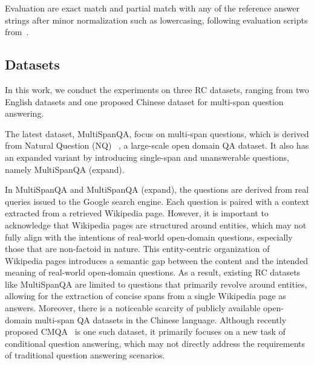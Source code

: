 \documentclass[a4paper]{cas-sc}
\newcommand{\1}[1]{\mathds{1}\left[#1\right]}
\begin{document}
Evaluation are exact match and partial match with any of the reference answer strings after minor normalization such as lowercasing, following evaluation scripts from~\cite{li2022multispanqa}.

\subsection{Datasets}
\label{sec:predata}
In this work, we conduct the experiments on three RC datasets, ranging from two English datasets and one proposed Chinese dataset for multi-span question answering. 

The latest dataset, MultiSpanQA, focus on multi-span questions, which is derived from Natural Question (NQ) ~\citep{DBLP:journals/tacl/KwiatkowskiPRCP19}, a large-scale open domain QA dataset. It also has an expanded variant by introducing single-span and unanswerable questions, namely MultiSpanQA (expand). 

In MultiSpanQA and MultiSpanQA (expand), the questions are derived from real queries issued to the Google search engine. Each question is paired with a context extracted from a retrieved Wikipedia page. However, it is important to acknowledge that Wikipedia pages are structured around entities, which may not fully align with the intentions of real-world open-domain questions, especially those that are non-factoid in nature. This entity-centric organization of Wikipedia pages introduces a semantic gap between the content and the intended meaning of real-world open-domain questions.
As a result, existing RC datasets like MultiSpanQA are limited to questions  that primarily revolve around entities, allowing for the extraction of concise spans from a single Wikipedia page as answers.
Moreover, there is a noticeable scarcity of publicly available open-domain multi-span QA datasets in the Chinese language. Although recently proposed CMQA~\citep{DBLP:conf/coling/JuWZZ0022} is one such dataset, it primarily focuses on a new task of conditional question answering, which may not directly address the requirements of traditional question answering scenarios. 
\end{document}
